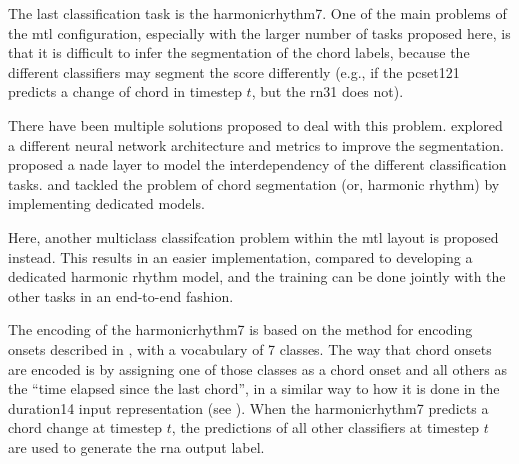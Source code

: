 
The last classification task is the \gls{harmonicrhythm7}.
One of the main problems of the \gls{mtl} configuration,
especially with the larger number of tasks proposed here, is
that it is difficult to infer the segmentation of the chord
labels, because the different classifiers may segment the
score differently (e.g., if the \gls{pcset121} predicts a
change of chord in timestep $t$, but the \gls{rn31} does
not).

There have been multiple solutions proposed to deal with
this problem. \textcite{chen2021attend} explored a different
neural network architecture and metrics to improve the
segmentation. \textcite{micchi2021deep} proposed a
\gls{nade} layer to model the interdependency of the
different classification tasks. \textcite{mcleod2021modular}
and \textcite{wu2021melody} tackled the problem of chord
segmentation (or, harmonic rhythm) by implementing dedicated
models. 

Here, another multiclass classifcation problem within the
\gls{mtl} layout is proposed instead. This results in an
easier implementation, compared to developing a dedicated
harmonic rhythm model, and the training can be done jointly
with the other tasks in an end-to-end fashion.

The encoding of the \gls{harmonicrhythm7} is based on the
method for encoding onsets described in
, with a
vocabulary of 7 classes. The way that chord onsets are
encoded is by assigning one of those classes as a chord
onset and all others as the ``time elapsed since the last
chord'', in a similar way to how it is done in the
\gls{duration14} input representation (see
). When the
\gls{harmonicrhythm7} predicts a chord change at timestep
$t$, the predictions of all other classifiers at timestep
$t$ are used to generate the \gls{rna} output label.
